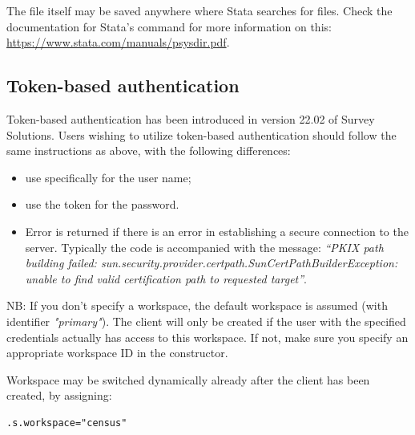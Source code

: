 The file itself may be saved anywhere where Stata searches for files. Check the
documentation for Stata's  command for more information on
this:\newline
\href{https://www.stata.com/manuals/psysdir.pdf}{https://www.stata.com/manuals/psysdir.pdf}.

\subsection{Token-based authentication}
Token-based authentication has been introduced in version 22.02 of Survey Solutions. Users wishing to utilize token-based authentication should follow the same instructions as above, with the following differences:
\begin{itemize}
  \item use specifically \textquotedbl *\textquotedbl \hspace{0.125cm} for the user name;
  \item use the token for the password.
\end{itemize}

\errheader
\begin{itemize}
    \item Error  is returned if there is an error in establishing a
    secure connection to the server. Typically the code is accompanied with the
    message: \newline
    \textit{``PKIX path building failed: sun.security.provider.certpath.SunCertPathBuilderException: unable to find valid certification path to requested target''}.
\end{itemize}

NB: If you don't specify a workspace, the default workspace is assumed (with
identifier \textit{"primary"}). The client will only be created if the user
with the specified credentials actually has access to this workspace. If not,
make sure you specify an appropriate workspace ID in the constructor.

Workspace may be switched dynamically already after the client has been created,
by assigning:
\begin{lstlisting}[style=CommandLineStyle, showlines=true]
.s.workspace="census"
\end{lstlisting}
